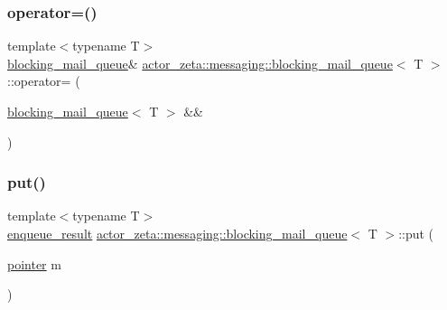 \subsubsection{\texorpdfstring{operator=()}{operator=()}\hspace{0.1cm}{\footnotesize\ttfamily [2/2]}}
{\footnotesize\ttfamily template$<$typename T$>$ \\
\hyperlink{classactor__zeta_1_1messaging_1_1blocking__mail__queue}{blocking\+\_\+mail\+\_\+queue}\& \hyperlink{classactor__zeta_1_1messaging_1_1blocking__mail__queue}{actor\+\_\+zeta\+::messaging\+::blocking\+\_\+mail\+\_\+queue}$<$ T $>$\+::operator= (\begin{DoxyParamCaption}\item[{\hyperlink{classactor__zeta_1_1messaging_1_1blocking__mail__queue}{blocking\+\_\+mail\+\_\+queue}$<$ T $>$ \&\&}]{ }\end{DoxyParamCaption})\hspace{0.3cm}{\ttfamily [default]}}

\mbox{\label{classactor__zeta_1_1messaging_1_1blocking__mail__queue_a738f8b8948ace649ab23b5fb312bf3da}} 
\subsubsection{\texorpdfstring{put()}{put()}}
{\footnotesize\ttfamily template$<$typename T$>$ \\
\hyperlink{namespaceactor__zeta_1_1messaging_ac2c5f2f473c5a97d779ec63a78d498a1}{enqueue\+\_\+result} \hyperlink{classactor__zeta_1_1messaging_1_1blocking__mail__queue}{actor\+\_\+zeta\+::messaging\+::blocking\+\_\+mail\+\_\+queue}$<$ T $>$\+::put (\begin{DoxyParamCaption}\item[{\hyperlink{classactor__zeta_1_1messaging_1_1blocking__mail__queue_a64432628c6a91d330431fc3299021045}{pointer}}]{m }\end{DoxyParamCaption})\hspace{0.3cm}{\ttfamily [inline]}}

\mbox{\label{classactor__zeta_1_1messaging_1_1blocking__mail__queue_a26fa1043b83e6956362282989cb18f3d}} 
